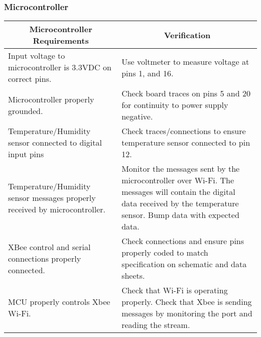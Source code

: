 \subsubsection{Microcontroller}
\begin{tabular}{|p{}|p{}|}
\hline
\multicolumn{1}{|c|}{Microcontroller Requirements} & \multicolumn{1}{|c|}{Verification} \\
\hline\hline
Input voltage to microcontroller is 3.3VDC on correct pins.  & Use voltmeter to measure voltage at pins 1, and 16. \\
\hline
Microcontroller properly grounded. & Check board traces on pins 5 and 20 for continuity to power supply negative. \\
\hline
Temperature/Humidity sensor connected to digital input pins & Check traces/connections to ensure temperature sensor connected to pin 12. \\
\hline
Temperature/Humidity sensor messages properly received by microcontroller. & Monitor the messages sent by the microcontroller over Wi-Fi.  The messages will contain the digital data received by the temperature sensor. Bump data with expected data.\\
\hline
XBee control and serial connections properly connected. & Check connections and ensure pins properly coded to match specification on schematic and data sheets.\\
\hline
MCU properly controls Xbee Wi-Fi. & Check that Wi-Fi is operating properly. Check that Xbee is sending messages by monitoring the port and reading the stream.\\
\hline
\end{tabular}

